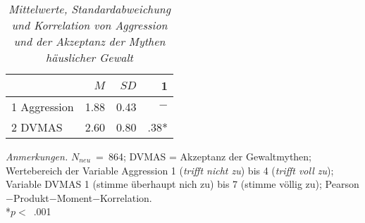 \begin{table}[htb]
    \caption[Mittelwerte, Standardabweichung und Korrelation von Aggression und der Akzeptanz der Mythen häuslicher Gewalt]{\textit {Mittelwerte, Standardabweichung und Korrelation von Aggression und der Akzeptanz der Mythen häuslicher Gewalt}} 
    \label{H2_Pearson}
    \centering
    \begin{adjustbox}{width=5.5cm} %
    \small
    \begin{tabular}{lrrr}
      \hline
        & $M$   & $SD$ & 1 \\
      \hline
    1 Aggression      & 1.88 & 0.43  & $-$      \\
    2 DVMAS           & 2.60 & 0.80  & .38*      \\
       \hline
    \end{tabular}
    \end{adjustbox}
    
    \begin{tablenotes}
        \item \textit{Anmerkungen.} \( N_{neu} \)~=~864; DVMAS = Akzeptanz der Gewaltmythen; Wertebereich der Variable Aggression 1 (\textit{trifft nicht zu}) bis 4 (\textit{trifft voll zu}); Variable DVMAS 1 (stimme überhaupt nich zu) bis 7 (stimme völlig zu); Pearson$-$Produkt$-$Moment$-$Korrelation. \\ *$p<$~.001
      \end{tablenotes}
    \end{table}

